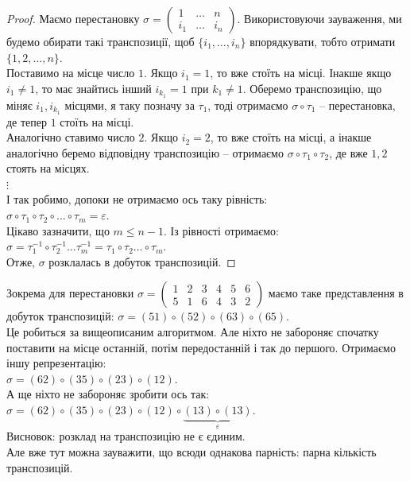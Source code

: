 \documentclass{math_library}
\begin{document}
\begin{proof}
Маємо перестановку $\sigma = \begin{pmatrix}
1 & \dots & n \\
i_1 & \dots & i_n
\end{pmatrix}$. Використовуючи зауваження, ми будемо обирати такі транспозиції, щоб $\{i_1,\dots,i_n\}$ впорядкувати, тобто отримати $\{1,2,\dots,n\}$.\\
Поставимо на місце число $1$. Якщо $i_1 = 1$, то вже стоїть на місці. Інакше якщо $i_1 \neq 1$, то має знайтись інший $i_{k_1} = 1$ при $k_1 \neq 1$. Оберемо транспозицію, що міняє $i_1, i_{k_1}$ місцями, я таку позначу за $\tau_1$, тоді отримаємо $\sigma \circ \tau_1$ -- перестановка, де тепер $1$ стоїть на місці.\\
Аналогічно ставимо число $2$. Якщо $i_2 = 2$, то вже стоїть на місці, а інакше аналогічно беремо відповідну транспозицію -- отримаємо $\sigma \circ \tau_1 \circ \tau_2$, де вже $1,2$ стоять на місцях.\\
$\vdots$\\
І так робимо, допоки не отримаємо ось таку рівність:\\
$\sigma \circ \tau_1 \circ \tau_2 \circ \dots \circ \tau_m = \varepsilon$.\\
Цікаво зазначити, що $m \leq n-1$. Із рівності отримаємо:\\
$\sigma = \tau_1^{-1} \circ \tau_2^{-1} \dots \tau_{m}^{-1} = \tau_1 \circ \tau_2 \dots \circ \tau_m$.\\
Отже, $\sigma$ розклалась в добуток транспозицій. 
\end{proof}

\begin{example}
Зокрема для перестановки $\sigma = \begin{pmatrix}
1 & 2 & 3 & 4 & 5 & 6 \\
5 & 1 & 6 & 4 & 3 & 2
\end{pmatrix}$ маємо таке представлення в добуток транспозицій: $\sigma = (51) \circ (52) \circ (63) \circ (65)$.\\
Це робиться за вищеописаним алгоритмом. Але ніхто не забороняє спочатку поставити на місце останній, потім передостанній і так до першого. Отримаємо іншу репрезентацію:\\
$\sigma = (62) \circ (35) \circ (23) \circ (12)$.\\
А ще ніхто не забороняє зробити ось так:\\
$\sigma = (62) \circ (35) \circ (23) \circ (12) \circ \underbrace{(13) \circ (13)}_{\varepsilon}$.\\
Висновок: розклад на транспозицію не є єдиним.\\
Але вже тут можна зауважити, що всюди однакова парність: парна кількість транспозицій.
\end{example}
\end{document}
